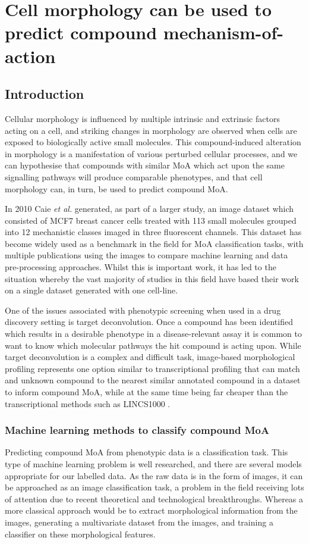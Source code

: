 \documentclass[a4paper,11pt,twoside,openright]{scrbook}
\begin{document}
\chapter{Cell morphology can be used to predict compound mechanism-of-action} \label{chapter:moa}

\section{Introduction}
Cellular morphology is influenced by multiple intrinsic and extrinsic factors acting on a cell, and striking changes in morphology are observed when cells are exposed to biologically active small molecules.
This compound-induced alteration in morphology is a manifestation of various perturbed cellular processes, and we can hypothesise that compounds with similar MoA which act upon the same signalling pathways will produce comparable phenotypes, and that cell morphology can, in turn, be used to predict compound MoA.

In 2010 Caie \textit{et al.} generated, as part of a larger study, an image dataset which consisted of MCF7 breast cancer cells treated with 113 small molecules grouped into 12 mechanistic classes imaged in three fluorescent channels.\cite{Caie2010}
This dataset has become widely used as a benchmark in the field for MoA classification tasks, with multiple publications using the images to compare machine learning and data pre-processing approaches. \cite{Ljosa2013a,Singh2014a,Pawlowski2016,Ando2017}
Whilst this is important work, it has led to the situation whereby the vast majority of studies in this field have based their work on a single dataset generated with one cell-line.

One of the issues associated with phenotypic screening when used in a drug discovery setting is target deconvolution.
Once a compound has been identified which results in a desirable phenotype in a disease-relevant assay it is common to want to know which molecular pathways the hit compound is acting upon.
While target deconvolution is a complex and difficult task, image-based morphological profiling represents one option similar to transcriptional profiling that can match and unknown compound to the nearest similar annotated compound in a dataset to inform compound MoA, while at the same time being far cheaper than the transcriptional methods such as LINCS1000 \cite{Duan2014}.


\subsection{Machine learning methods to classify compound MoA}
Predicting compound MoA from phenotypic data is a classification task.
This type of machine learning problem is well researched, and there are several models appropriate for our labelled data.
As the raw data is in the form of images, it can be approached as an image classification task, a problem in the field receiving lots of attention due to recent theoretical and technological breakthroughs. %
Whereas a more classical approach would be to extract morphological information from the images, generating a multivariate dataset from the images, and training a classifier on these morphological features.
\end{document}
